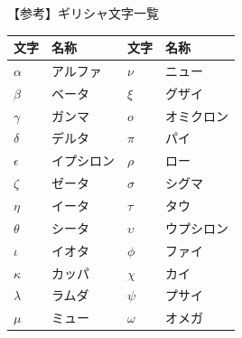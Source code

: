 \documentclass[dvipdfmx,aspectratio=169]{beamer}
\begin{document}
	
	\begin{frame}{【参考】ギリシャ文字一覧}
		\begin{table}[]
			\begin{tabular}{ll|ll}
				\toprule
				文字         & 名称    & 文字         & 名称    \\
				\midrule
				$\alpha$   & アルファ  & $\nu$      & ニュー   \\
				$\beta$    & ベータ   & $\xi$      & グザイ   \\
				$\gamma$   & ガンマ   & $o$        & オミクロン \\
				$\delta$   & デルタ   & $\pi$      & パイ    \\
				$\epsilon$ & イプシロン & $\rho$     & ロー    \\
				$\zeta$    & ゼータ   & $\sigma$   & シグマ   \\
				$\eta$     & イータ   & $\tau$     & タウ    \\
				$\theta$   & シータ   & $\upsilon$ & ウプシロン \\
				$\iota$     & イオタ   & $\phi$     & ファイ   \\
				$\kappa$   & カッパ   & $\chi$     & カイ    \\
				$\lambda$  & ラムダ   & $\psi$     & プサイ   \\
				$\mu$      & ミュー   & $\omega$   & オメガ  \\
				\bottomrule
			\end{tabular}
		\end{table}
	\end{frame}
\end{document}

